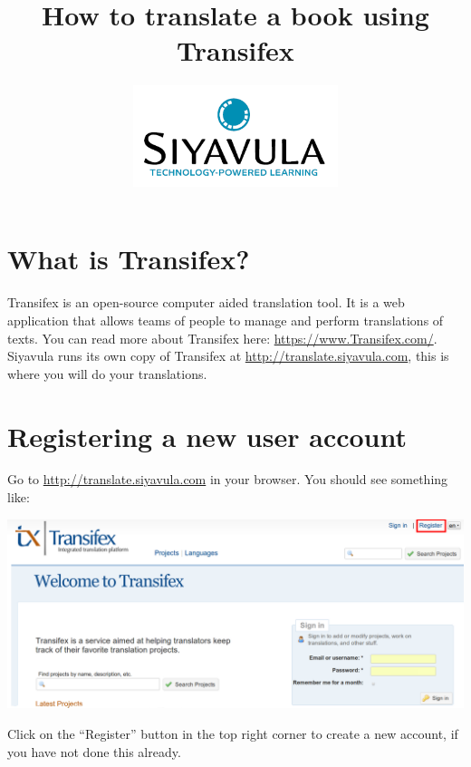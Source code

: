 \documentclass[12pt, a4paper]{article}
\title{How to translate a book using Transifex}
\author{\includegraphics[width=6cm]{images/Siyavulalogo.png}}
\date{}
\begin{document}
\maketitle
\tableofcontents
\section{What is Transifex?}

Transifex is an open-source computer aided translation tool. It is a web application that allows teams of people to manage and perform translations of texts. You can read more about Transifex here: \url{https://www.Transifex.com/}. Siyavula  runs its own copy of Transifex at  \url{http://translate.siyavula.com}, this is where you will do your translations.


\section{Registering a new user account}

Go to \url{http://translate.siyavula.com} in your browser. You should see something like:

\begin{center}
    \centerline{\includegraphics[width=0.8\paperwidth]{images/Screenshot.png}}
\end{center}
Click on the ``Register'' button in the top right corner to create a new account, if you have not done this already.
\end{document}
